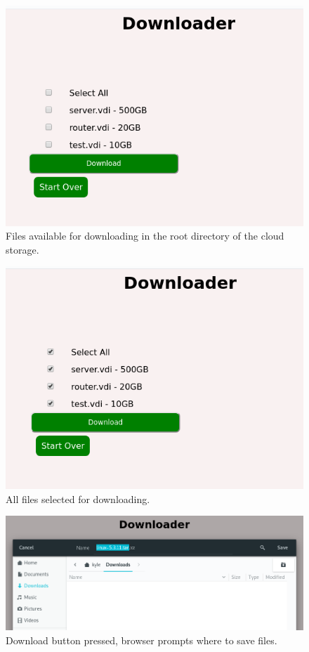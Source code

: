 \documentclass{article}
\begin{document}
    \begin{figure}[h]
    \includegraphics[scale=.7]{s4}
        \caption{Files available for downloading in the root directory of the cloud storage.}
    \end{figure}

    \begin{figure}[h]
    \includegraphics[scale=.7]{s5}
        \caption{All files selected for downloading.}
    \end{figure}

    \begin{figure}[h]
    \includegraphics[scale=.5]{s6}
        \caption{Download button pressed, browser prompts where to save files.}
    \end{figure}
\end{document}
